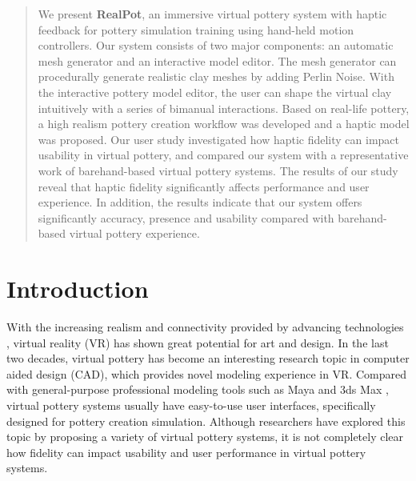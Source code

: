 \documentclass{svjour3}                     %
\begin{document}
\begin{abstract}

We present \textbf{RealPot}, an immersive virtual pottery system with haptic feedback for pottery simulation training using hand-held motion controllers.
%
Our system consists of two major components: an automatic mesh generator and an interactive model editor.
%
The mesh generator can procedurally generate realistic clay meshes by adding Perlin Noise.
%
With the interactive pottery model editor, the user can shape the virtual clay intuitively with a series of bimanual interactions.
%
Based on real-life pottery, a high realism pottery creation workflow was developed and a haptic model was proposed.
%
Our user study investigated how haptic fidelity can impact usability in virtual pottery, and compared our system with a representative work of barehand-based virtual pottery systems.
%
The results of our study reveal that haptic fidelity significantly affects performance and user experience.
%
In addition, the results indicate that our system offers significantly accuracy, presence and usability compared with barehand-based virtual pottery experience.


\end{abstract}



\section{Introduction}
\label{sec:intro}

With the increasing realism and connectivity provided by advancing technologies \cite{wang2018a,bastug2017toward}, virtual reality (VR) has shown great potential for art and design.
%
In the last two decades, virtual pottery has become an interesting research topic in computer aided design (CAD), which provides novel modeling experience in VR.
%
Compared with general-purpose professional modeling tools such as Maya \cite{website:maya} and 3ds Max \cite{website:3dmax}, virtual pottery systems usually have easy-to-use user interfaces, specifically designed for pottery creation simulation.
%
Although researchers have explored this topic by proposing a variety of virtual pottery systems, it is not completely clear how fidelity can impact usability and user performance in virtual pottery systems.
\end{document}
